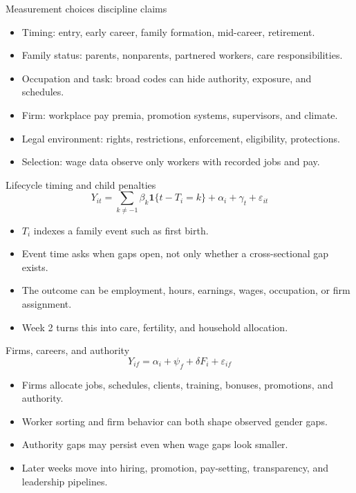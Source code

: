 \documentclass[aspectratio=169,11pt]{beamer}
\begin{document}
\begin{frame}{Measurement choices discipline claims}
\begin{itemize}
    \item Timing: entry, early career, family formation, mid-career, retirement.
    \item Family status: parents, nonparents, partnered workers, care responsibilities.
    \item Occupation and task: broad codes can hide authority, exposure, and schedules.
    \item Firm: workplace pay premia, promotion systems, supervisors, and climate.
    \item Legal environment: rights, restrictions, enforcement, eligibility, protections.
    \item Selection: wage data observe only workers with recorded jobs and pay.
\end{itemize}
\end{frame}

\begin{frame}{Lifecycle timing and child penalties}
\[
Y_{it} =
\sum_{k \neq -1}\beta_k \mathbf{1}\{t - T_i = k\}
+ \alpha_i + \gamma_t + \varepsilon_{it}
\]
\begin{itemize}
    \item $T_i$ indexes a family event such as first birth.
    \item Event time asks when gaps open, not only whether a cross-sectional gap exists.
    \item The outcome can be employment, hours, earnings, wages, occupation, or firm assignment.
    \item Week 2 turns this into care, fertility, and household allocation.
\end{itemize}
\end{frame}

\begin{frame}{Firms, careers, and authority}
\[
Y_{if} = \alpha_i + \psi_f + \delta F_i + \varepsilon_{if}
\]
\begin{itemize}
    \item Firms allocate jobs, schedules, clients, training, bonuses, promotions, and authority.
    \item Worker sorting and firm behavior can both shape observed gender gaps.
    \item Authority gaps may persist even when wage gaps look smaller.
    \item Later weeks move into hiring, promotion, pay-setting, transparency, and leadership pipelines.
\end{itemize}
\end{frame}
\end{document}
